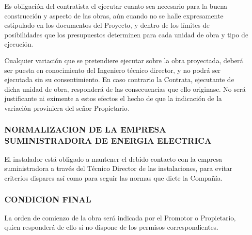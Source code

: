 \documentclass{article}
\begin{document}
{Es obligación del contratista el ejecutar cuanto sea necesario para la buena construcción y aspecto de las obras, aún cuando no se halle expresamente estipulado en los documentos del Proyecto, y dentro de los límites de posibilidades que los presupuestos determinen para cada unidad de obra y tipo de ejecución.

Cualquier variación que se pretendiere ejecutar sobre la obra proyectada, deberá ser puesta en conocimiento del Ingeniero técnico director, y no podrá ser ejecutada sin su consentimiento. En caso contrario la Contrata, ejecutante de dicha unidad de obra, responderá de las consecuencias que ello originase. No será justificante ni eximente a estos efectos el hecho de que la indicación de la variación proviniera del señor Propietario.

\subsubsection{NORMALIZACION DE LA EMPRESA SUMINISTRADORA DE ENERGIA ELECTRICA}

El instalador está obligado a mantener el debido contacto con la empresa suministradora a través del Técnico Director de las instalaciones, para evitar criterios dispares así como para seguir las normas que dicte la Compañía.

\subsubsection{CONDICION FINAL}

La orden de comienzo de la obra será indicada por el Promotor o
Propietario, quien responderá de ello si no dispone de los permisos
correspondientes.






}
\end{document}

